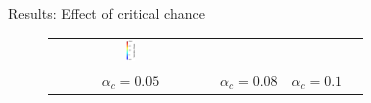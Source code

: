 \documentclass[10pt,xcolor=dvipsnames,compress]{beamer}
\begin{document}
\begin{frame}{Results: Effect of critical chance}
\begin{figure}
\begin{tabular}{c c c c}
        \includegraphics[width=0.06\textwidth]{Figures/CC_contour.png}\\
        $\alpha_{c} = 0.05 $ & $\alpha_{c} = 0.08 $ & $\alpha_{c} = 0.1 $&\\
        \end{tabular}
        
        \label{fig:1}
    \end{figure}
\end{frame}


\end{document}
